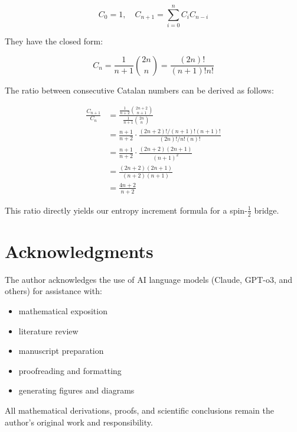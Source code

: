 \documentclass[11pt, a4paper]{article}
\theoremstyle{plain}
\theoremstyle{definition}
\theoremstyle{remark}
\begin{document}
\begin{equation}
C_0 = 1, \quad C_{n+1} = \sum_{i=0}^{n} C_i C_{n-i}
\end{equation}

They have the closed form:

\begin{equation}
C_n = \frac{1}{n+1}\binom{2n}{n} = \frac{(2n)!}{(n+1)!n!}
\end{equation}

The ratio between consecutive Catalan numbers can be derived as follows:

\begin{align}
\frac{C_{n+1}}{C_n} &= \frac{\frac{1}{n+2}\binom{2n+2}{n+1}}{\frac{1}{n+1}\binom{2n}{n}} \\
&= \frac{n+1}{n+2} \cdot \frac{(2n+2)!/(n+1)!(n+1)!}{(2n)!/n!(n)!} \\
&= \frac{n+1}{n+2} \cdot \frac{(2n+2)(2n+1)}{(n+1)^2} \\
&= \frac{(2n+2)(2n+1)}{(n+2)(n+1)} \\
&= \frac{4n+2}{n+2}
\end{align}

This ratio directly yields our entropy increment formula for a spin-$\frac{1}{2}$ bridge.

\section*{Acknowledgments}
The author acknowledges the use of AI language models (Claude, GPT-o3, and others) for assistance with:

\begin{itemize}
\item mathematical exposition
\item literature review
\item manuscript preparation
\item proofreading and formatting
\item generating figures and diagrams
\end{itemize}
 
 All mathematical derivations, proofs, and scientific conclusions remain the author's original work and responsibility.
\end{document}
